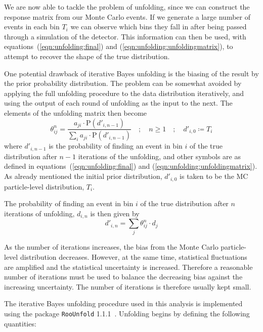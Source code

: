 We are now able to tackle the problem of unfolding, since we can
construct the response matrix from our Monte Carlo events.
If we generate a large number of events in each bin $T_i$ we can observe which bins they fall in after being passed through a simulation of the detector.
This information can then be used, with equations~(\ref{eqn:unfolding:final}) and (\ref{eqn:unfolding:unfoldingmatrix}), to attempt
to recover the shape of the true distribution.

One potential drawback of iterative Bayes unfolding is the biasing of the result by the prior probability distribution.
The problem can be somewhat avoided by applying the full unfolding procedure to the data distribution iteratively, and using the output of each round of unfolding
as the input to the next.
The elements of the unfolding matrix then become
\begin{equation}
  \theta_{ij}^{n} = \frac{a_{ji}\cdot\mathrm{P}(d'_{i,n-1})}{\sum_i a_{ji}\cdot \mathrm{P}(d'_{i,n-1})}\quad ;\quad n\ge1\quad;\quad d'_{i,0} \coloneqq T_i
\end{equation}
where $d'_{i,n-1}$ is the probability of finding an event in bin $i$ of the true distribution after $n-1$ iterations of the unfolding,
and other symbols are as defined in equations~(\ref{eqn:unfolding:final}) and (\ref{eqn:unfolding:unfoldingmatrix}). As already mentioned the initial prior
distribution, $d'_{i,0}$ is taken to be the MC particle-level distribution, $T_i$.

The probability of finding an event in bin $i$ of the true distribution after $n$ iterations of unfolding, $d_{i,n}$ is then given by
\begin{equation}
  d'_{i,n} = \sum_j \theta_{ij}^{n}\cdot d_j
  \label{eqn:unfolding:iterative}
\end{equation}

As the number of iterations increases, the bias from the Monte Carlo particle-level distribution decreases. However, at the same time,
statistical fluctuations are amplified and the statistical uncertainty is increased. Therefore a reasonable number of iterations must
be used to balance the decreasing bias against the increasing uncertainty. The number of iterations is therefore usually kept small.

The iterative Bayes unfolding procedure used in this analysis is implemented using the package \texttt{RooUnfold} 1.1.1~\cite{Adye:2011gm}.  Unfolding begins by defining the following quantities:

